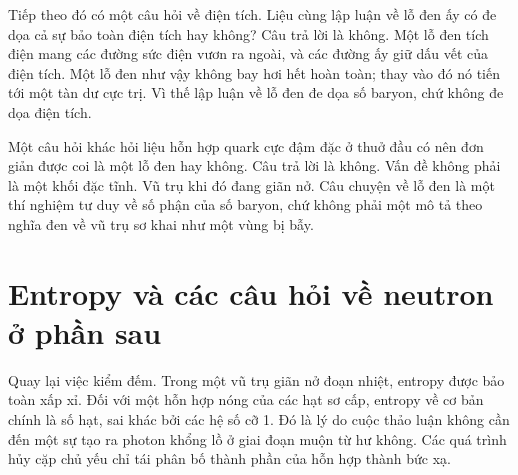 \begin{classroomqa}
\end{classroomqa}

Tiếp theo đó có một câu hỏi về điện tích. Liệu cùng lập luận về lỗ đen ấy có đe dọa cả sự bảo toàn điện tích hay không? Câu trả lời là không. Một lỗ đen tích điện mang các đường sức điện vươn ra ngoài, và các đường ấy giữ dấu vết của điện tích. Một lỗ đen như vậy không bay hơi hết hoàn toàn; thay vào đó nó tiến tới một tàn dư cực trị. Vì thế lập luận về lỗ đen đe dọa số baryon, chứ không đe dọa điện tích.

Một câu hỏi khác hỏi liệu hỗn hợp quark cực đậm đặc ở thuở đầu có nên đơn giản được coi là một lỗ đen hay không. Câu trả lời là không. Vấn đề không phải là một khối đặc tĩnh. Vũ trụ khi đó đang giãn nở. Câu chuyện về lỗ đen là một thí nghiệm tư duy về số phận của số baryon, chứ không phải một mô tả theo nghĩa đen về vũ trụ sơ khai như một vùng bị bẫy.

\begin{classroomqa}
\end{classroomqa}

\section{Entropy và các câu hỏi về neutron ở phần sau}

Quay lại việc kiểm đếm. Trong một vũ trụ giãn nở đoạn nhiệt, entropy được bảo toàn xấp xỉ. Đối với một hỗn hợp nóng của các hạt sơ cấp, entropy về cơ bản chính là số hạt, sai khác bởi các hệ số cỡ 1. Đó là lý do cuộc thảo luận không cần đến một sự tạo ra photon khổng lồ ở giai đoạn muộn từ hư không. Các quá trình hủy cặp chủ yếu chỉ tái phân bố thành phần của hỗn hợp thành bức xạ.

